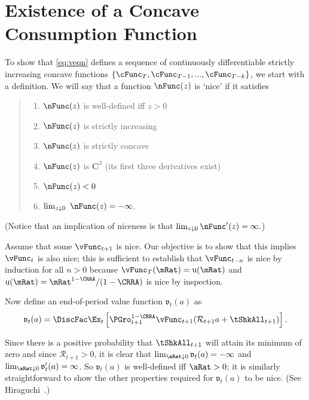 \documentclass[titlepage]{\econtex}\providecommand{\texname}{BufferStockTheory}%
\begin{document}
\section{Existence of a Concave Consumption Function}\label{sec:ApndxcExists}

To show that \eqref{eq:veqn} defines a sequence of continuously
differentiable strictly increasing concave functions
$\{\cFunc_{T},\cFunc_{T-1},...,\cFunc_{T-k}\}$, we start with a
definition.  We will say that a function $\nFunc(z)$ is `nice' if it
satisfies
\begin{quote}
\begin{enumerate}\setlength{\itemsep}{0.0ex}
\item $\nFunc(z)$ is well-defined iff $z>0$

\item $\nFunc(z)$ is strictly increasing

\item $\nFunc(z)$ is strictly concave

\item $\nFunc(z)$ is $ \mathbf{C}^{3}$ (its first three derivatives exist)

\item $\nFunc(z)<0$

\item $\lim_{z\downarrow 0}~\nFunc(z) =-\infty $.

\end{enumerate}
\end{quote}

(Notice that an implication of niceness is that $\lim_{z \downarrow 0} \nFunc^{\prime}(z) = \infty.$)

Assume that some $\vFunc_{t+1}$ is nice.  Our objective is to show that this
implies $\vFunc_{t}$ is also nice; this is sufficient to establish that
$\vFunc_{t-n}$ is nice by induction for all $n > 0$ because $\vFunc_{T}(\mRat)
=\util(\mRat) $ and $\util(\mRat)=\mRat^{1-\CRRA}/(1-\CRRA)$ is nice by inspection.

Now define an end-of-period value function $\mathfrak{v}_{t}(a) $ as
\begin{equation}
\mathfrak{v}_{t}(a) =\DiscFac \Ex_{t}\left[{\PGro}_{t+1}^{1-\CRRA}\vFunc_{t+1}( {\mathcal{R}}_{t+1} a+{\tShkAll}_{t+1}) \right]. \label{eq:vEnd}
\end{equation}

Since there is a positive probability that $\tShkAll_{t+1}$ will
attain its minimum of zero and since $\mathcal{R}_{t+1}>0$, it
is clear that $\lim_{\aRat \downarrow 0} \mathfrak{v}_{t}(a) = -\infty$
and $\lim_{\aRat \downarrow 0} \mathfrak{v}^{\prime}_{t}(a) = \infty$.  So
$\mathfrak{v}_{t}(a) $ is well-defined iff $\aRat>0$; it is similarly
straightforward to show the other properties required for $\mathfrak{v}_{t}(a) $ to
be nice.  (See Hiraguchi~\citeyearpar{hiraguchiBSProofs}.)
\end{document}
